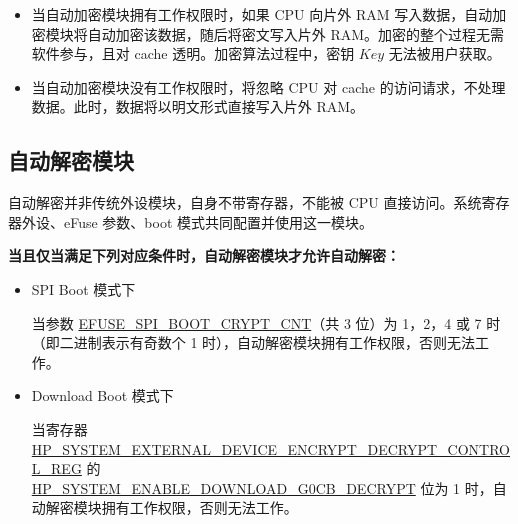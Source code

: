 \documentclass[main\_\_CN.tex]{subfiles}
\begin{document}
\begin{tiplisting}
\vspace{-2em}
\begin{itemize}

\item 当自动加密模块拥有工作权限时，如果 CPU 向片外 RAM 写入数据，自动加密模块将自动加密该数据，随后将密文写入片外 RAM。加密的整个过程无需软件参与，且对 cache 透明。加密算法过程中，密钥 \begin{math}\mathit{Key}\end{math} 无法被用户获取。

\item 当自动加密模块没有工作权限时，将忽略 CPU 对 cache 的访问请求，不处理数据。此时，数据将以明文形式直接写入片外 RAM。


\end{itemize}
\end{tiplisting}

\subsection{自动解密模块}

自动解密并非传统外设模块，自身不带寄存器，不能被 CPU 直接访问。系统寄存器外设、eFuse 参数、boot 模式共同配置并使用这一模块。

\textbf{当且仅当满足下列对应条件时，自动解密模块才允许自动解密：}

\begin{itemize}

    \item SPI Boot 模式下

    当参数 \hyperref[fielddesc:EFUSESPIBOOTCRYPTCNT]{EFUSE\_SPI\_BOOT\_CRYPT\_CNT}（共 3 位）为 1，2，4 或 7 时（即二进制表示有奇数个 1 时），自动解密模块拥有工作权限，否则无法工作。

    \item Download Boot 模式下

    当寄存器 \hyperref[regdesc:HPSYSTEMEXTERNALDEVICEENCRYPTDECRYPTCONTROLREG]{HP\_SYSTEM\_EXTERNAL\_DEVICE\_ENCRYPT\_DECRYPT\_CONTROL\_REG} 的 \\ \hyperref[fielddesc:HPSYSTEMENABLEDOWNLOADG0CBDECRYPT]{HP\_SYSTEM\_ENABLE\_DOWNLOAD\_G0CB\_DECRYPT} 位为 1 时，自动解密模块拥有工作权限，否则无法工作。

\end{itemize}
\end{document}
